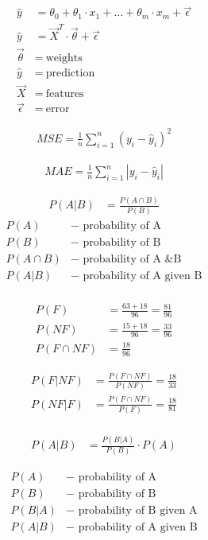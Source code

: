 \documentclass[USenglish,final,authoryear,12pt]{article}
\begin{document}
\begin{align*}
	\hat{y} &= \theta_0 + \theta_1\cdot x_1 + \dots + \theta_m\cdot x_m +\vec{\epsilon} \\
	\hat{y} &= \vec{X}^T \cdot \vec{\theta}+\vec{\epsilon}\\
	\vec{\theta} &=~\text{weights}\\
	\hat{y} &=~\text{prediction}\\
	\vec{X} &=~\text{features}\\
	\vec{\epsilon} &=~\text{error}
\end{align*}

\begin{align*}
	MSE = \frac{1}{n}\sum_{i = 1}^{n}\left(y_i-\hat{y}_i\right)^2
\end{align*}

\begin{align*}
	MAE = \frac{1}{n}\sum_{i = 1}^{n}\left|y_i-\hat{y}_i\right|
\end{align*}

\begin{align*}
	P(A|B) &= \frac{P(A\cap B)}{P(B)}
\end{align*}
\begin{align*}
	P(A) &- \text{ probability of A}\\
	P(B) &- \text{ probability of B}\\
	P(A\cap B) &- \text{ probability of A \& B}\\
	P(A|B) &- \text{ probability of A given B}\\
\end{align*}

\begin{align*}
	P(F) &= \frac{63+18}{96} = \frac{81}{96}\\
	P(NF) &= \frac{15+18}{96} = \frac{33}{96}\\
	P(F\cap NF) &= \frac{18}{96}
\end{align*}

\begin{align*}
	P(F|NF) &= \frac{P(F\cap NF)}{P(NF)} = \frac{18}{33}\\
	P(NF|F) &= \frac{P(F\cap NF)}{P(F)} = \frac{18}{81}\\
\end{align*}

\begin{align*}
	P(A | B) &= \frac{P(B | A)}{P(B)}\cdot P(A)
\end{align*}

\begin{align*}
P(A) &- \text{ probability of A}\\
P(B) &- \text{ probability of B}\\
P(B|A) &- \text{ probability of B given A}\\
P(A|B) &- \text{ probability of A given B}\\
\end{align*}
\end{document}
